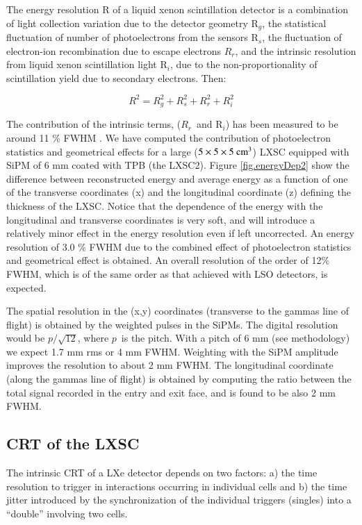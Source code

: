 \documentclass[review]{elsarticle}
\begin{document}
The energy resolution R of a liquid xenon scintillation detector is a combination of light collection variation due to the detector geometry R$_g$, the statistical fluctuation of number of photoelectrons from the sensors R$_s$, the fluctuation of electron-ion recombination due to escape electrons $R_r$, and the intrinsic resolution from liquid xenon scintillation light R$_i$, due to the non-proportionality of scintillation yield due to secondary electrons. Then:

\begin{equation}
R^2 = R_g^2 + R_s^2 + R_r^2 + R_i^2
\end{equation}

The contribution of the intrinsic terms, ($R_r$~and R$_i$) has been measured to be
around 11 \% FWHM \cite{aprileRes}. We have computed the contribution of photoelectron statistics and geometrical effects for a large
($5 \times 5 \times 5 {\rm ~cm^3}$) LXSC equipped with SiPM of 6 mm coated with TPB (the LXSC2).  
Figure \ref{fig.energyDep2} show the difference between reconstructed energy and average energy as a function of one of the transverse coordinates (x) and the longitudinal coordinate (z) defining the thickness of the LXSC. Notice that the dependence of the energy with the longitudinal and transverse coordinates is very soft, and will introduce a relatively minor effect in the energy resolution even if left uncorrected. An energy resolution of 3.0 \% FWHM due to the combined effect of photoelectron statistics and geometrical effect is obtained. 
An overall resolution of the order of 12\% FWHM, which is of the same order as that achieved with LSO detectors, is expected. 

The spatial resolution in the (x,y) coordinates (transverse to the gammas line of flight) is obtained by the weighted pulses in the SiPMs. The digital resolution would be
$p/\sqrt{12}$, where $p$~is the pitch. With a pitch of 6 mm (see methodology) we expect 1.7 mm rms or 4 mm FWHM. Weighting with the SiPM amplitude improves the resolution to about 2 mm FWHM. The longitudinal coordinate (along the gammas line of flight) is obtained by computing the ratio between the
total signal recorded in the entry and exit face, and is found to be also 2 mm FWHM. 


\subsection*{CRT  of the LXSC}

The intrinsic CRT of a LXe detector depends on two factors: a) the time resolution to trigger in interactions occurring in individual cells and b) the time jitter introduced by the synchronization of the individual triggers (singles) into a ``double'' involving two cells. 
\end{document}

